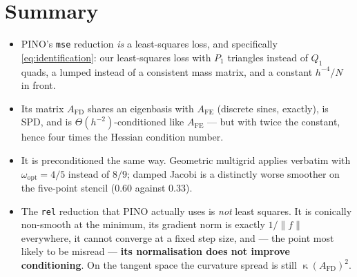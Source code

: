 \documentclass[11pt]{article}
\newcommand{\Afd}{A_{\mathrm{FD}}}
\newcommand{\Afe}{A_{\mathrm{FE}}}
\DeclareMathOperator{\cond}{\kappa}
\begin{document}
\section{Summary}

\begin{itemize}
  \item PINO's \texttt{mse} reduction \emph{is} a least-squares loss, and specifically
  \eqref{eq:identification}: our least-squares loss with $P_1$ triangles instead of $Q_1$ quads, a
  lumped instead of a consistent mass matrix, and a constant $h^{-4}/N$ in front.
  \item Its matrix $\Afd$ shares an eigenbasis with $\Afe$ (discrete sines, exactly), is SPD, and
  is $\Theta(h^{-2})$-conditioned like $\Afe$ --- but with twice the constant, hence four times the
  Hessian condition number.
  \item It is preconditioned the same way. Geometric multigrid applies verbatim with
  $\omega_{\mathrm{opt}}=4/5$ instead of $8/9$; damped Jacobi is a distinctly worse smoother on the
  five-point stencil ($0.60$ against $0.33$).
  \item The \texttt{rel} reduction that PINO actually uses is \emph{not} least squares. It is
  conically non-smooth at the minimum, its gradient norm is exactly $1/\|f\|$ everywhere, it cannot
  converge at a fixed step size, and --- the point most likely to be misread --- \textbf{its
  normalisation does not improve conditioning}. On the tangent space the curvature spread is still
  $\cond(\Afd)^2$.
\end{itemize}
\end{document}
